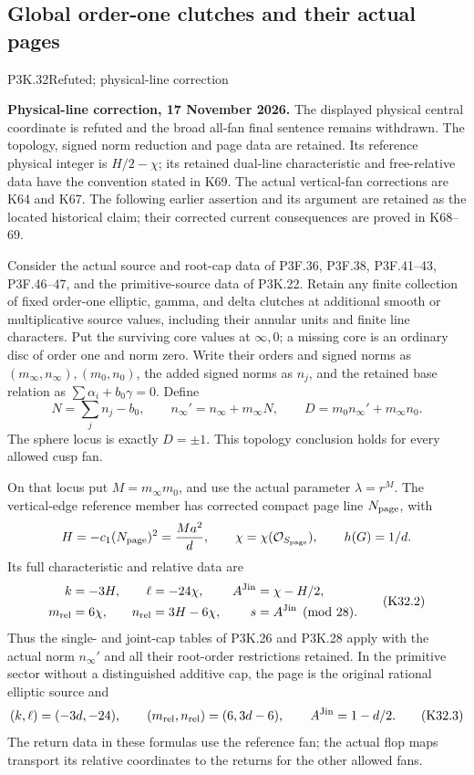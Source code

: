\subsection{Global order-one clutches and their actual pages}

\begin{statement}{P3K.32}{Refuted; physical-line correction}\par\noindent\textbf{Physical-line correction, 17 November 2026.} The displayed physical central coordinate is refuted and the broad all-fan final sentence remains withdrawn. The topology, signed norm reduction and page data are retained. Its reference physical integer is \(H/2-\chi\); its retained dual-line characteristic and free-relative data have the convention stated in K69. The actual vertical-fan corrections are K64 and K67. The following earlier assertion and its argument are retained as the located historical claim; their corrected current consequences are proved in K68--69.\medskip\par 
Consider the actual source and root-cap data of P3F.36, P3F.38,
P3F.41--43, P3F.46--47, and the primitive-source data of P3K.22.
Retain any finite collection of fixed order-one elliptic, gamma,
and delta clutches at additional smooth or multiplicative source
values, including their annular units and finite line characters.
Put the surviving core values at $\infty,0$; a missing core is
an ordinary disc of order one and norm zero. Write their orders
and signed norms as $(m_\infty,n_\infty),(m_0,n_0)$, the added
signed norms as $n_j$, and the retained base relation as
$\sum\alpha_i+b_0\gamma=0$. Define
\[
 N=\sum_jn_j-b_0,\qquad
 n_\infty'=n_\infty+m_\infty N,\qquad
 D=m_0n_\infty'+m_\infty n_0.                         \tag{K32.1}
\]
The sphere locus is exactly $D=\pm1$. This topology conclusion
holds for every allowed cusp fan.

On that locus put $M=m_\infty m_0$, and use the actual
parameter $\lambda=r^M$. The vertical-edge reference member
has corrected compact page line $N_{\rm page}$, with
\[
 H=-c_1(N_{\rm page})^2=\frac{Ma^2}{d},\qquad
 \chi=\chi(\mathcal O_{S_{\rm page}}),\qquad h(G)=1/d.
\]
Its full characteristic and relative data are
\[
 \begin{aligned}
 k&=-3H,&\ell&=-24\chi,& A^{\rm Jin}&=\chi-H/2,\\
 m_{\rm rel}&=6\chi,&n_{\rm rel}&=3H-6\chi,
 &s&=A^{\rm Jin}\pmod {28}.                           
 \end{aligned}\tag{K32.2}
\]
Thus the single- and joint-cap tables of P3K.26 and P3K.28
apply with the actual norm $n_\infty'$ and all their root-order
restrictions retained. In the primitive sector without a
distinguished additive cap, the page is the original rational
elliptic source and
\[
 (k,\ell)=(-3d,-24),\qquad
 (m_{\rm rel},n_{\rm rel})=(6,3d-6),\qquad
 A^{\rm Jin}=1-d/2.                                   \tag{K32.3}
\]
The return data in these formulas use the reference fan;
the actual flop maps transport its relative coordinates to
the returns for the other allowed fans.
\end{statement}

